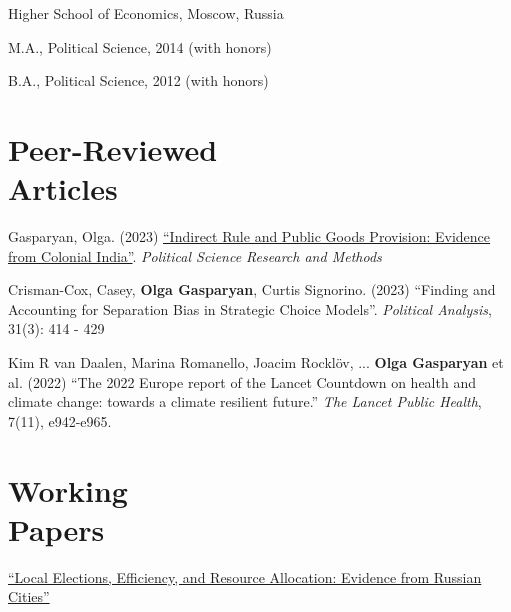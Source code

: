 \documentclass[margin,line,10.95pt]{res}
\newenvironment{list1}{
  \begin{list}{\ding{113}}{%
      \setlength{\itemsep}{0in}
      \setlength{\parsep}{0in} \setlength{\parskip}{0in}
      \setlength{\topsep}{0in} \setlength{\partopsep}{0in}
      \setlength{\leftmargin}{0.17in}}}{\end{list}}
\begin{document}
\begin{resume}
\vspace{-3mm}
{Higher School of Economics, Moscow, Russia}\\
\vspace*{-.1in}
\begin{list1}
 \item[] M.A., Political Science, 2014 (with honors) 
\item[] B.A., Political Science, 2012 (with honors)
\end{list1}



\section{\sc Peer-Reviewed \\ Articles}
Gasparyan, Olga. (2023) \href{https://doi.org/10.1017/psrm.2023.31}{``Indirect Rule and Public Goods Provision: Evidence from Colonial India''}. \textit{Political Science Research and Methods}

\vspace*{-2.5mm}

Crisman-Cox, Casey, \textbf{Olga Gasparyan}, Curtis Signorino. (2023) ``Finding and Accounting for Separation Bias in Strategic Choice Models''. \textit{Political Analysis}, 31(3): 414 - 429

\vspace*{-2.5mm}

Kim R van Daalen, Marina Romanello, Joacim Rocklöv, ... \textbf{Olga Gasparyan} et al. (2022) ``The 2022 Europe report of the Lancet Countdown on health and climate change: towards a climate resilient future.'' \textit{The Lancet Public Health}, 7(11), e942-e965.


\section{\sc Working \\ Papers}
\href{https://olgasparyan.com/documents/jmp_feb.pdf}{``Local Elections, Efficiency, and Resource Allocation: Evidence from Russian Cities''}


\end{resume}
\end{document}
